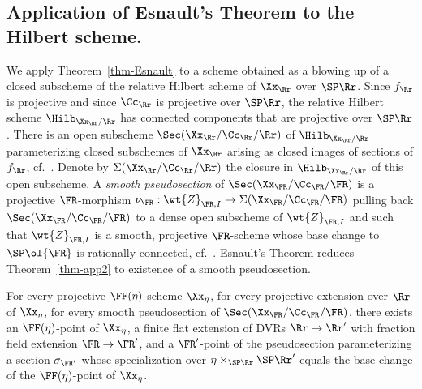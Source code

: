 \subsection{Application of Esnault's Theorem to the Hilbert scheme.} \label{subsec-Hilb}
We apply Theorem~\ref{thm-Esnault} to a scheme obtained as a blowing up of a closed subscheme of the relative Hilbert scheme of $\Xx_\Rr$ over $\SP \Rr$. Since $f_\Rr$ is projective and since $\Cc_\Rr$ is projective over $\SP \Rr$, the relative Hilbert scheme $\Hilb_{\Xx_\Rr/\Rr}$ has connected components that are projective over $\SP \Rr$. There is an open subscheme $\Sec(\Xx_\Rr/\Cc_\Rr/\Rr)$ of $\Hilb_{\Xx_\Rr/\Rr}$ parameterizing closed subschemes of $\Xx_\Rr$ arising as closed images of sections of $f_\Rr$, cf.~\cite[Part IV.4.c, p.~221--219]{FGA}. Denote by $\Sigma(\Xx_\Rr/\Cc_\Rr/\Rr)$ the closure in $\Hilb_{\Xx_\Rr/\Rr}$ of this open subscheme. A \emph{smooth pseudosection} of $\Sec(\Xx_\FR/\Cc_\FR/\FR)$ is a projective $\FR$-morphism $\nu_\FR:\wt{Z}_{\FR,I}\to \Sigma(\Xx_\FR/\Cc_\FR/\FR)$ pulling back $\Sec(\Xx_\FR/\Cc_\FR/\FR)$ to a dense open subscheme of $\wt{Z}_{\FR,I}$ and such that $\wt{Z}_{\FR,I}$ is a smooth, projective $\FR$-scheme whose base change to $\SP \ol{\FR}$ is rationally connected, cf.~\cite[Definition~1.2]{GHMS}. Esnault's Theorem reduces Theorem~\ref{thm-app2} to existence of a smooth pseudosection.

\begin{prop}\label{prop-pseudo}
For every projective $\FF(\eta)$-scheme $\Xx_\eta$, for every projective extension over $\Rr$ of $\Xx_\eta$, for every smooth pseudosection of $\Sec(\Xx_\FR/\Cc_\FR/\FR)$, there exists an $\FF(\eta)$-point of $\Xx_\eta$, a finite flat extension of DVRs $\Rr \to \Rr'$ with fraction field extension $\FR\to \FR'$, and a $\FR'$-point of the pseudosection parameterizing a section $\sigma_{\FR'}$ whose specialization over $\eta \times_{\SP \Rr}\SP \Rr'$ equals the base change of the $\FF(\eta)$-point of $\Xx_\eta$.
\end{prop}

